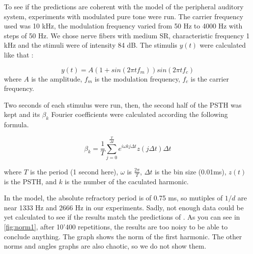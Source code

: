 To see if the predictions are coherent with the model of the peripheral auditory 
system, experiments with modulated pure tone were run. 
The carrier frequency used was 10 kHz, the modulation frequency varied from 50 Hz to 4000 Hz
with steps of 50 Hz. We chose nerve fibers with medium SR, characteristic frequency 1 kHz 
and the stimuli were of intensity 84 dB.
The stimulis $y\left(t\right)$ were calculated like that :

\begin{equation}\label{freqstim} y\left(t\right) = A \left(1+sin \left(2 \pi t f_m \right)\right) sin \left(2 \pi t f_c \right)\end{equation} %
where $A$ is the amplitude,
$f_m$ is the modulation frequency,
$f_c$ is the carrier frequency.

 
Two seconds of each stimulus were run, 
then, the second half of the PSTH was kept and its $\beta_k$ Fourier coefficients were calculated according the following formula.

\begin{equation}\label{bkformula} \beta_k = \frac{1}{T} \sum_{j= 0}^{\frac{T}{\Delta t}} e^{i \omega k j \Delta t} z \left( j \Delta t\right)\Delta t\end{equation}

where $T$ is the period (1 second here), %
 $\omega$ is $\frac{2\pi}{T}$,
$\Delta t$ is the bin size (0.01ms),
$z\left(t\right)$ is the PSTH,
and $k$ is the number of the caculated harmonic.

In the model, the absolute refractory period is of 0.75 ms, so mutiples of $1/d$ are near 1333 Hz and 2666 Hz in our experiments.
Sadly, not enough data could be yet calculated to see if the results match the predictions of 
\cite{Deger}. 
As you can see in \autoref{fig:norm1}, after 10'400 repetitions, the results are too noisy to be able to conclude anything. 
The graph shows the norm of the first harmonic. The other norms and angles graphs are also chaotic, so we do not show them.












 